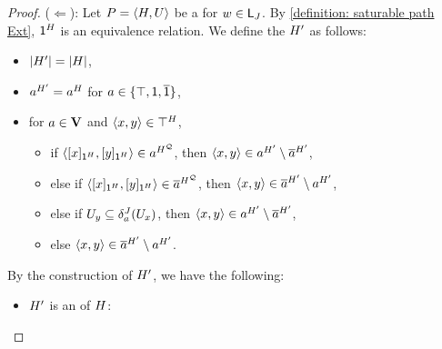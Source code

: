 \begin{proof}
($\Leftarrow$):
Let $P = \tuple{\graph[2], U}$ be a  for $\word \in \const{L}_{\graph[3]}$.
By \ref{definition: saturable path Ext}, $\id^{\graph[2]}$ is an equivalence relation.
We define the  $\graph[2]'$ as follows:
\begin{itemize}
       \item $\univ{\graph[2]'} = \univ{\graph[2]}$,
       \item $a^{\graph[2]'} = a^{\graph[2]}$ for $a \in \{\top, \mathsf{1}, \overline{\mathsf{1}}\}$,
       \item for $a \in \mathbf{V}$ and $\tuple{x, y} \in \top^{\graph[2]}$,
       \begin{itemize}
              \item if $\tuple{\quo{x}_{\id^{\graph[2]}}, \quo{y}_{\id^{\graph[2]}}} \in a^{\graph[2]^{\FillQ}}$, then $\tuple{x, y} \in a^{\graph[2]'} \setminus \com{a}^{\graph[2]'}$,
              \item else if $\tuple{\quo{x}_{\id^{\graph[2]}}, \quo{y}_{\id^{\graph[2]}}} \in \com{a}^{\graph[2]^{\FillQ}}$, then $\tuple{x, y} \in \com{a}^{\graph[2]'} \setminus a^{\graph[2]'}$,
              \item else if $U_{y} \subseteq \delta_{a}^{\graph[3]}(U_{x})$, then $\tuple{x, y} \in a^{\graph[2]'} \setminus \com{a}^{\graph[2]'}$,
              \item else $\tuple{x, y} \in \com{a}^{\graph[2]'} \setminus a^{\graph[2]'}$.
       \end{itemize}
\end{itemize}
By the construction of $\graph[2]'$, we have the following:
\begin{itemize}
       \item $\graph[2]'$ is an  of $\graph[2]$:

\end{itemize}
\end{proof}
